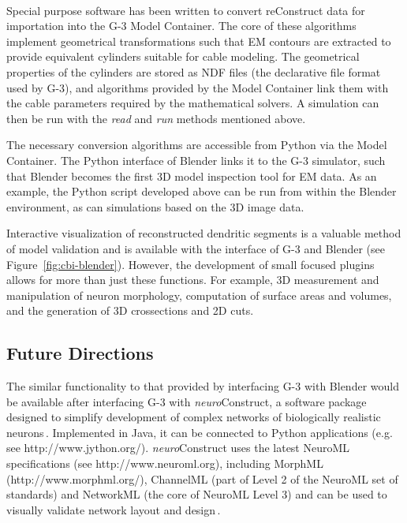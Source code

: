 \documentclass[10pt]{article}
\begin{document}
\\


Special purpose software has been written to convert reConstruct data
for importation into the G-3 Model Container.  The core of these
algorithms implement geometrical transformations such that EM
contours are extracted to provide equivalent cylinders suitable for
cable modeling.  The geometrical properties of the cylinders are
stored as NDF files (the declarative file format used by G-3), and algorithms
provided by the Model Container link them with the cable parameters
required by the mathematical solvers.  A simulation can then be run
with the {\it read} and {\it run} methods mentioned above.

The necessary conversion algorithms are accessible from Python via the
Model Container.  The Python interface of Blender links it to the G-3
simulator, such that Blender becomes the first 3D model inspection
tool for EM data.  As an example, the Python script developed above
can be run from within the Blender environment, as can simulations based on the 3D image
data.

Interactive visualization of reconstructed dendritic segments is a
valuable method of model validation and is available with the
interface of G-3 and Blender (see Figure~\ref{fig:cbi-blender}).  However, the development of small
focused plugins allows for more than just these functions. For
example, 3D measurement and manipulation of neuron morphology,
computation of surface areas and volumes, and the generation of 3D
crossections and 2D cuts.

\subsection*{Future Directions}
The similar functionality to that provided by interfacing G-3 with Blender would be available after interfacing G-3
with {\it neuro}Construct, a software package designed to simplify
development of complex networks of biologically realistic
neurons\,\cite{gleeson05:_build_networ_model}.  Implemented in Java,
it can be connected to Python applications (e.g. see
http://www.jython.org/).  {\it neuro}Construct uses the latest NeuroML
specifications (see http://www.neuroml.org), including MorphML
(http://www.morphml.org/), ChannelML (part of Level 2 of the NeuroML
set of standards) and NetworkML (the core of NeuroML Level 3) and can
be used to visually validate network layout and
design\,\cite{crook07:_morph}.
\end{document}

